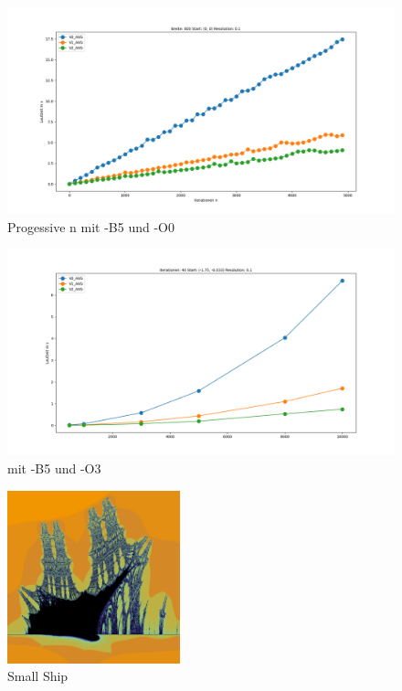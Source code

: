 \documentclass[course=erap]{aspdoc}
\begin{document}
\begin{figure}[htp]
    \centering
    \includegraphics[width=14cm]{data/o0progressive_n.png}
    \caption{Progessive n mit -B5 und -O0}
    \label{fig:0progressive_n}
\end{figure}

\begin{figure}[htp]
    \centering
    \includegraphics[width=14cm]{data/Small ship_dot_line.png}
    \caption{ mit -B5 und -O3}
    \label{fig:small_ship_graph}
\end{figure}

\begin{figure}[htp]
    \centering
    \includegraphics[width=5cm]{data/small_ship.png}
    \caption{Small Ship}
    \label{fig:small_ship}
\end{figure}
\end{document}
